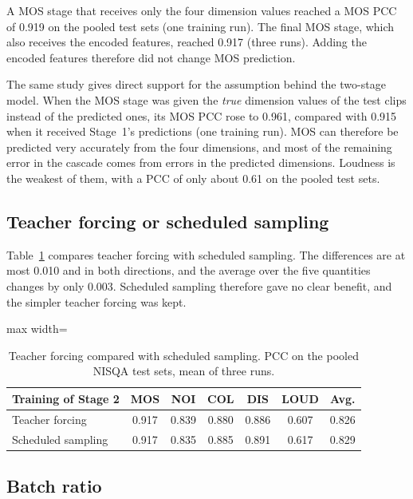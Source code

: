 \documentclass[
english,                 %
bibtex,                  %
includeExtraAbstracts, %
]{kththesis}
\numberwithin{listing}{chapter}
\begin{document}
A MOS stage that receives only the four dimension values reached a MOS PCC of 0.919 on the pooled test sets (one training run). The final MOS stage, which also receives the encoded features, reached 0.917 (three runs). Adding the encoded features therefore did not change MOS prediction.

The same study gives direct support for the assumption behind the two-stage model. When the MOS stage was given the \emph{true} dimension values of the test clips instead of the predicted ones, its MOS PCC rose to 0.961, compared with 0.915 when it received Stage~1's predictions (one training run). MOS can therefore be predicted very accurately from the four dimensions, and most of the remaining error in the cascade comes from errors in the predicted dimensions. Loudness is the weakest of them, with a PCC of only about 0.61 on the pooled test sets.

\subsection{Teacher forcing or scheduled sampling}

Table~\ref{tab:scheduledSampling} compares teacher forcing with scheduled sampling. The differences are at most 0.010 and in both directions, and the average over the five quantities changes by only 0.003. Scheduled sampling therefore gave no clear benefit, and the simpler teacher forcing was kept.

\begin{table}[!ht]
  \centering
  \caption{Teacher forcing compared with scheduled sampling. PCC on the pooled NISQA test sets, mean of three runs.}
  \label{tab:scheduledSampling}
  \setlength{\tabcolsep}{4pt}
  \begin{adjustbox}{max width=\textwidth}
  \begin{tabular}{lcccccc}
    \toprule
    Training of Stage 2 & MOS & NOI & COL & DIS & LOUD & Avg. \\
    \midrule
    Teacher forcing     & 0.917 & 0.839 & 0.880 & 0.886 & 0.607 & 0.826 \\
    Scheduled sampling  & 0.917 & 0.835 & 0.885 & 0.891 & 0.617 & 0.829 \\
    \bottomrule
  \end{tabular}
  \end{adjustbox}
\end{table}

\subsection{Batch ratio}
\end{document}
